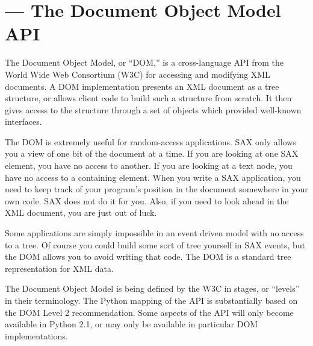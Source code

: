 \section{ ---
         The Document Object Model API}



The Document Object Model, or ``DOM,'' is a cross-language API from
the World Wide Web Consortium (W3C) for accessing and modifying XML
documents.  A DOM implementation presents an XML document as a tree
structure, or allows client code to build such a structure from
scratch.  It then gives access to the structure through a set of
objects which provided well-known interfaces.

The DOM is extremely useful for random-access applications.  SAX only
allows you a view of one bit of the document at a time.  If you are
looking at one SAX element, you have no access to another.  If you are
looking at a text node, you have no access to a containing element.
When you write a SAX application, you need to keep track of your
program's position in the document somewhere in your own code.  SAX
does not do it for you.  Also, if you need to look ahead in the XML
document, you are just out of luck.

Some applications are simply impossible in an event driven model with
no access to a tree.  Of course you could build some sort of tree
yourself in SAX events, but the DOM allows you to avoid writing that
code.  The DOM is a standard tree representation for XML data.


The Document Object Model is being defined by the W3C in stages, or
``levels'' in their terminology.  The Python mapping of the API is
substantially based on the DOM Level 2 recommendation.  Some aspects
of the API will only become available in Python 2.1, or may only be
available in particular DOM implementations.

